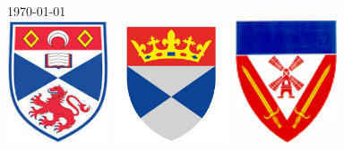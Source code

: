 \documentclass[11pt, oneside]{Thesis} %
\begin{document}
\begin{titlepage}
\begin{center}
{\large \today}\\[4cm] %
\includegraphics[width=3cm]{standrews} %
\includegraphics[width=3.5cm]{dundee} %
\includegraphics[width=3cm]{vermeulen} %

\vfill
\end{center}

\end{titlepage}

\clearpage %

\end{document}
